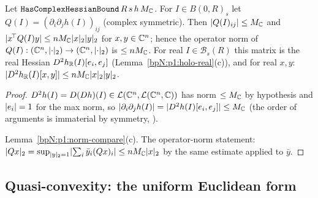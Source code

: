 \begin{lemma}\label{bpN:p1:hessian-convert}
Let $\texttt{HasComplexHessianBound}\,R\,s\,h\,M_{\mathbb{C}}$. For $I\in B(0,R)_s$ let $Q(I)=(\partial_i\partial_jh(I))_{ij}$ (complex symmetric). Then
$\lvert Q(I)_{ij}\rvert\le M_{\mathbb{C}}$ and $\lvert x^{\!\top}Q(I)y\rvert\le nM_{\mathbb{C}}\lvert x\rvert_2\lvert y\rvert_2$ for $x,y\in\mathbb{C}^n$; hence the operator norm of $Q(I):(\mathbb{C}^n,\lvert \cdot\rvert_2)\to(\mathbb{C}^n,\lvert \cdot\rvert_2)$ is $\le nM_{\mathbb{C}}$.
For real $I\in\mathcal B_s(R)$ this matrix is the real Hessian $D^2h_{\mathbb{R}}(I)[e_i,e_j]$ (Lemma~\ref{bpN:p1:holo-real}(c)), and for real $x,y$: $\lvert D^2h_{\mathbb{R}}(I)[x,y]\rvert\le nM_{\mathbb{C}}\lvert x\rvert_2\lvert y\rvert_2$.
\end{lemma}
\begin{proof}
\label{stepN:p1:hc-entries} $D^2h(I)=D(Dh)(I)\in\mathcal L(\mathbb{C}^n,\mathcal L(\mathbb{C}^n,\mathbb{C}))$ has norm $\le M_{\mathbb{C}}$ by hypothesis and $\lvert e_i\rvert=1$ for the max norm, so $\lvert \partial_i\partial_jh(I)\rvert=\lvert D^2h(I)[e_i,e_j]\rvert\le M_{\mathbb{C}}$ (the order of arguments is immaterial by symmetry, ).

\label{stepN:p1:hc-eucl} Lemma~\ref{bpN:p1:norm-compare}(c). The operator-norm statement: $\lvert Qx\rvert_2=\sup_{\lvert y\rvert_2=1}\lvert \sum_i\bar y_i(Qx)_i\rvert\le nM_{\mathbb{C}}\lvert x\rvert_2$ by the same estimate applied to $\bar y$.
\end{proof}

\subsection{Quasi-convexity: the uniform Euclidean form}\label{bpN:p1:s-qc}

